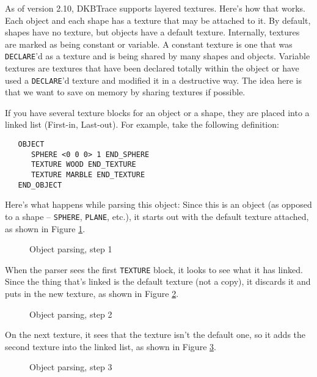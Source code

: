 As of version 2.10, DKBTrace supports layered textures.  Here's how
that works.  Each object and each shape has a texture that may be
attached to it.  By default, shapes have no texture, but objects have
a default texture.  Internally, textures are marked as being constant
or variable.  A constant texture is one that was
{\tt DECLARE}'d as a
texture and is being shared by many shapes and objects.  Variable
textures are textures that have been declared totally within the
object or have used a {\tt DECLARE}'d texture and modified it in a
destructive way.  The idea here is that we want to save on memory by
sharing textures if possible.

If you have several texture blocks for an object or a shape, they are placed
into a linked list (First-in, Last-out).
For example, take the following
definition:
\begin{verbatim}
   OBJECT
      SPHERE <0 0 0> 1 END_SPHERE
      TEXTURE WOOD END_TEXTURE
      TEXTURE MARBLE END_TEXTURE
   END_OBJECT
\end{verbatim}
Here's what happens while parsing this object: Since this is an object
(as opposed to a shape -- {\tt SPHERE}, {\tt PLANE}, etc.), it starts
out with the default texture attached, as shown in Figure \ref{parse1}.
\begin{figure}[htbp]
\begin{centering}

\caption{Object parsing, step 1}
\label{parse1}
\end{centering}
\end{figure}
When the parser sees the first {\tt TEXTURE} block, it looks to see what it has
linked.  Since the thing that's linked is the default texture (not a copy), it
discards it and puts in the new texture, as shown in Figure \ref{parse2}.
\begin{figure}[htbp]
\begin{centering}

\caption{Object parsing, step 2}
\label{parse2}
\end{centering}
\end{figure}
On the next texture, it sees that the texture isn't the default one, so it
adds the second texture into the linked list, as shown in Figure \ref{parse3}.
\begin{figure}[htbp]
\begin{centering}

\caption{Object parsing, step 3}
\label{parse3}
\end{centering}
\end{figure}

